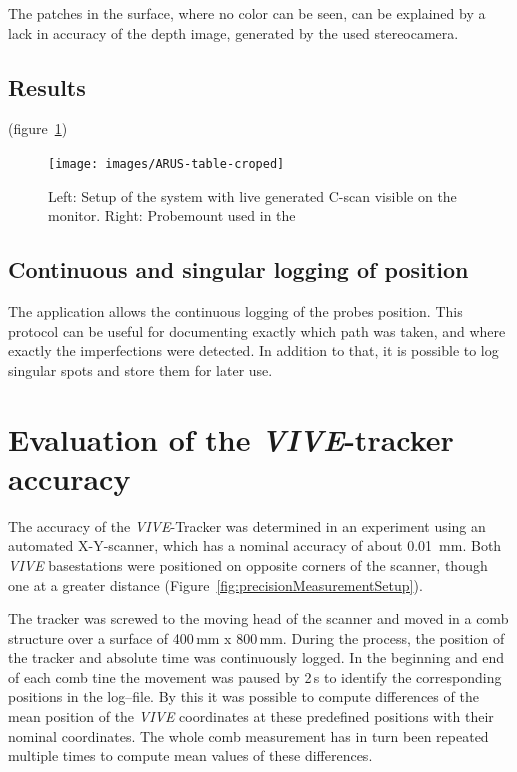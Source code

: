 \documentclass{VRARWorkshop}
\begin{document}
The patches in the surface, where no color can be seen, can be explained by a lack in accuracy of the depth image, generated by the used stereocamera.

\subsection{Results}

(figure~\ref{fig:AR-table})

\begin{figure}[h!]
    \begin{center}
        \texttt{[image: images/ARUS-table-croped]}
        \caption{\label{fig:AR-table} Left: Setup of the system with live generated C-scan visible on the monitor. Right: Probemount used in the }
    \end{center}
\end{figure}

\subsection{Continuous and singular logging of position}
The application allows the continuous logging of the probes position.
This protocol can be useful for documenting exactly which path was taken, and where exactly the imperfections were detected.
In addition to that, it is possible to log singular spots and store them for later use.

\section{Evaluation of the \textit{VIVE}-tracker accuracy}
The accuracy of the \textit{VIVE}-Tracker was determined in an experiment using an automated X-Y-scanner, which has a nominal accuracy of about 0.01~mm.
Both \textit{VIVE} basestations were positioned on opposite corners of the scanner, though one at a greater distance (Figure~\ref{fig:precisionMeasurementSetup}).

The tracker was screwed to the moving head of the scanner and moved in a comb structure over a surface of 400\,mm x 800\,mm.
During the process, the position of the tracker and absolute time was continuously logged.
In the beginning and end of each comb tine the movement was paused by 2\,s to identify the corresponding positions in the log--file.
By this it was possible to compute differences of the mean position of the
\textit{VIVE} coordinates at these predefined positions with their nominal coordinates. 
The whole comb measurement has in turn been repeated multiple times to compute mean values of these differences.
\end{document}

